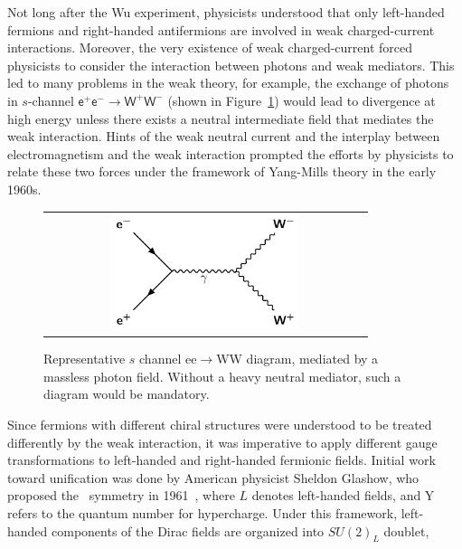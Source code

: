 Not long after the Wu experiment, physicists understood that only left-handed fermions and right-handed antifermions are involved in weak charged-current interactions. Moreover, the very existence of weak charged-current forced physicists to consider the interaction between photons and weak mediators. This led to many problems in the weak theory, for example, the exchange of photons in $s$-channel $\textsf{e}^{+}\textsf{e}^{-}\rightarrow\textsf{W}^{+}\textsf{W}^{-}$ (shown in Figure~\ref{fig:eeWW}) would lead to divergence at high energy unless there exists a neutral intermediate field that mediates the weak interaction. Hints of the weak neutral current and the interplay between electromagnetism and the weak interaction prompted the efforts by physicists to relate these two forces under the framework of Yang-Mills theory in the early 1960s. 

\begin{figure}[tbh!]
 \begin{center}
 \begin{tabular}{c}
 \includegraphics[width=0.6\textwidth]{figures/Part1/SM/eeWW}
 \end{tabular}
 \caption{Representative $s$ channel ee$\rightarrow$WW diagram, mediated by a massless photon field. Without a heavy neutral mediator, such a diagram would be mandatory.}
 \label{fig:eeWW}
 \end{center}
\end{figure}

Since fermions with different chiral structures were understood to be treated differently by the weak interaction, it was 
imperative to apply different gauge transformations to left-handed and right-handed fermionic fields. Initial work toward unification was done by American physicist Sheldon Glashow, who proposed the \ew~symmetry in 1961~\cite{Glashow:1961tr}, where $L$ denotes left-handed fields, and Y refers to the quantum number for hypercharge. Under this framework, left-handed components of the Dirac fields are organized into $SU(2)_{L}$ doublet,

